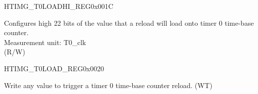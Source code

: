 \begin{register}{H}{TIMG\_T0LOADHI\_REG}{0x001C}\label{regdesc:TIMGTXLOADHIREG}
%
%
\regnewline%
\begin{regdesc}\begin{reglist}
\label{fielddesc:TIMGTXLOADHI}\item [TIMG\_T0\_LOAD\_HI] Configures high 22 bits of the value that a reload will load onto timer 0 time-base counter. \\
Measurement unit: T0\_clk \\ (R/W)
\end{reglist}\end{regdesc}
\end{register}


\begin{register}{H}{TIMG\_T0LOAD\_REG}{0x0020}\label{regdesc:TIMGTXLOADREG}
%
\regnewline%
\begin{regdesc}\begin{reglist}
\label{fielddesc:TIMGTXLOAD}\item [TIMG\_T0\_LOAD] Write any value to trigger a timer 0 time-base counter reload. (WT)
\end{reglist}\end{regdesc}
\end{register}


